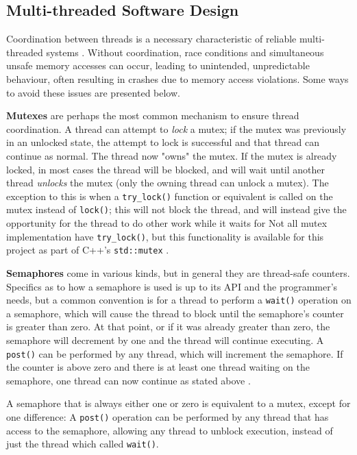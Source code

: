 \documentclass[11pt, a4paper, twocolumn]{article}
\begin{document}
\subsection{Multi-threaded Software Design}

Coordination between threads is a necessary characteristic of reliable multi-threaded systems \citep{Powell}. Without coordination, race conditions and simultaneous unsafe memory accesses can occur, leading to unintended, unpredictable behaviour, often resulting in crashes due to memory access violations. Some ways to avoid these issues are presented below.

\textbf{Mutexes} are perhaps the most common mechanism to ensure thread coordination. A thread can attempt to \emph{lock} a mutex; if the mutex was previously in an unlocked state, the attempt to lock is successful and that thread can continue as normal. The thread now "owns" the mutex. If the mutex is already locked, in most cases the thread will be blocked, and will wait until another thread \emph{unlocks} the mutex (only the owning thread can unlock a mutex). The exception to this is when a \verb|try_lock()| function or equivalent is called on the mutex instead of \verb|lock()|; this will not block the thread, and will instead give the opportunity for the thread to do other work while it waits for  Not all mutex implementation have \verb|try_lock()|, but this functionality is available for this project as part of C++'s \verb|std::mutex| \citep{CppMutex}.





\textbf{Semaphores} come in various kinds, but in general they are thread-safe counters. Specifics as to how a semaphore is used is up to its API and the programmer's needs, but a common convention is for a thread to perform a \verb|wait()| operation on a semaphore, which will cause the thread to block until the semaphore's counter is greater than zero. At that point, or if it was already greater than zero, the semaphore will decrement by one and the thread will continue executing. A \verb|post()| can be performed by any thread, which will increment the semaphore. If the counter is above zero and there is at least one thread waiting on the semaphore, one thread can now continue as stated above \citep{BoostSync}.

A semaphore that is always either one or zero is equivalent to a mutex, except for one difference: A \verb|post()| operation can be performed by any thread that has access to the semaphore, allowing any thread to unblock execution, instead of just the thread which called \verb|wait()|.
\end{document}
